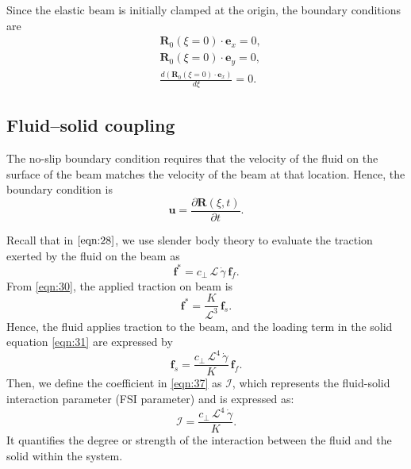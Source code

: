 \documentclass[a4paper,12pt]{report}
\begin{document}
Since the elastic beam is initially clamped at the origin, the boundary conditions are
\begin{equation}
	\label{eqn:58}
	\begin{aligned}
	&\mathbf{R}_0(\xi=0)\cdot\mathbf{e}_x=0,\\
	&\mathbf{R}_0(\xi=0)\cdot\mathbf{e}_y=0,\\
	&\frac{d\left(\mathbf{R}_0(\xi=0)\cdot\mathbf{e}_x\right)}{d\xi}=0.
	\end{aligned}
\end{equation}

\subsection{Fluid–solid coupling}
The no-slip boundary condition requires that the velocity of the fluid on the surface of the beam matches the velocity of the beam at that location. Hence, the boundary condition is 
\begin{equation}
	\label{eqn:100}
	\mathbf{u}=\frac{\partial \mathbf{R}(\xi,t)}{\partial t}.
\end{equation}

Recall that in $\eqref{eqn:28}$, we use slender body theory to evaluate the traction exerted by the fluid on the beam as
\begin{equation}
	\label{eqn:102}
	\mathbf{f}^*=c_\perp\,\mathcal{L}\,\dot{\gamma}\,\mathbf{f}_{f}.
\end{equation}
From \eqref{eqn:30}, the applied traction on beam is 
\begin{equation}
	\label{eqn:103}
	\mathbf{f}^*=\frac{K}{\mathcal{L}^3}\,\mathbf{f}_{s}.
\end{equation}
Hence, the fluid applies traction to the beam, and the loading term in the solid equation \eqref{eqn:31} are expressed by
\begin{equation}
	\label{eqn:37}
	\mathbf{f}_{s}=\frac{c_\perp\,\mathcal{L}^4\,\dot{\gamma}}{K}\,\mathbf{f}_{f}.
\end{equation}
Then, we define the coefficient in \eqref{eqn:37} as $\mathcal{I}$, which represents the fluid-solid interaction parameter (FSI parameter) and is expressed as:
\begin{equation}
	\label{eqn:38}
	\mathcal{I}=\frac{c_\perp\,\mathcal{L}^4\,\dot{\gamma}}{K}.
\end{equation}
It quantifies the degree or strength of the interaction between the fluid and the solid within the system.
\end{document}
